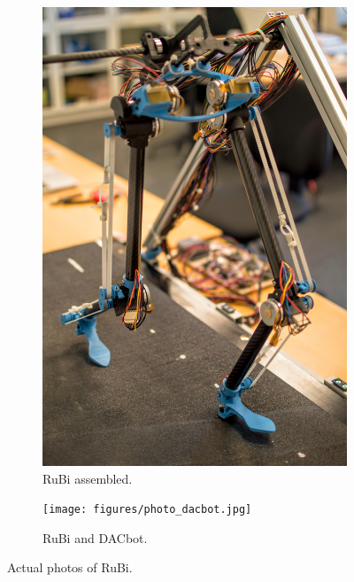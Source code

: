 \begin{figure}[ht!]
    \centering
    \begin{subfigure}[b]{0.39\textwidth}
        \includegraphics[width=\textwidth]{figures/photo_robot_walking.jpg}
        \caption{RuBi assembled.}
        \label{fig:photo_robot_walking}
    \end{subfigure}
    \begin{subfigure}[b]{0.39\textwidth}
        \texttt{[image: figures/photo\_dacbot.jpg]}
        \caption{RuBi and DACbot.}
        \label{fig:photo_dacbot}
    \end{subfigure}
    \caption{Actual photos of RuBi.}
\end{figure}    
